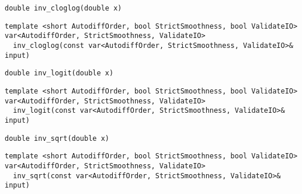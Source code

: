 \begin{tcolorbox}[colback=white,colframe=gray90, coltitle=black,boxrule=3pt,
fonttitle=\bfseries,title= Inv Cloglog]

\begin{verbatim}
double inv_cloglog(double x)

\end{verbatim}

\begin{verbatim}
template <short AutodiffOrder, bool StrictSmoothness, bool ValidateIO>
var<AutodiffOrder, StrictSmoothness, ValidateIO>
  inv_cloglog(const var<AutodiffOrder, StrictSmoothness, ValidateIO>& input)

\end{verbatim}

\end{tcolorbox}

\begin{tcolorbox}[colback=white,colframe=gray90, coltitle=black,boxrule=3pt,
fonttitle=\bfseries,title= Inv Logit]

\begin{verbatim}
double inv_logit(double x)

\end{verbatim}

\begin{verbatim}
template <short AutodiffOrder, bool StrictSmoothness, bool ValidateIO>
var<AutodiffOrder, StrictSmoothness, ValidateIO>
  inv_logit(const var<AutodiffOrder, StrictSmoothness, ValidateIO>& input)

\end{verbatim}

\end{tcolorbox}

\begin{tcolorbox}[colback=white,colframe=gray90, coltitle=black,boxrule=3pt,
fonttitle=\bfseries,title= Inv Sqrt]

\begin{verbatim}
double inv_sqrt(double x)

\end{verbatim}

\begin{verbatim}
template <short AutodiffOrder, bool StrictSmoothness, bool ValidateIO>
var<AutodiffOrder, StrictSmoothness, ValidateIO>
  inv_sqrt(const var<AutodiffOrder, StrictSmoothness, ValidateIO>& input)

\end{verbatim}

\end{tcolorbox}

